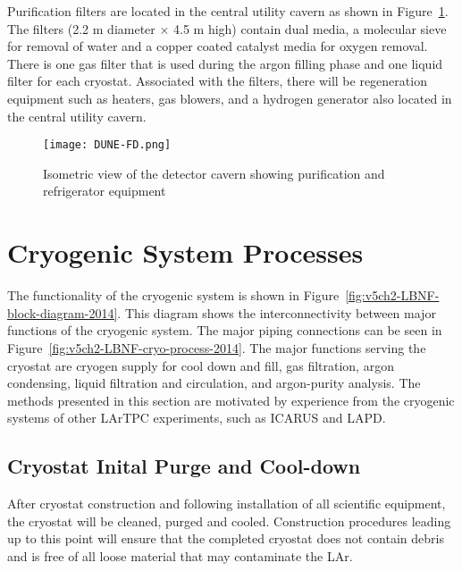 

Purification filters are located in the central utility cavern 
as shown in Figure~\ref{fig:det-cavern-purif}. The filters (2.2 m
diameter $\times$ 4.5 m high) contain dual media, a molecular sieve for removal of water and a copper
coated catalyst media for oxygen removal. There is one gas filter that is used during the argon
filling phase and one liquid filter for each cryostat. 
Associated with the
filters, there will be regeneration equipment such as heaters, gas blowers, and a hydrogen
generator also located in the central utility cavern.

\begin{figure}[htbp]
\centering
\texttt{[image: DUNE-FD.png]} 
\caption{Isometric view of the detector cavern showing purification and 
refrigerator equipment}
\label{fig:det-cavern-purif}
\end{figure}


\chapter{Cryogenic System Processes}
\label{sec:cryo-cryosys-proc}
The functionality of the cryogenic system is
shown in Figure~\ref{fig:v5ch2-LBNF-block-diagram-2014}. This diagram shows
the interconnectivity between major functions of the cryogenic system. The major piping
connections can be seen in Figure~\ref{fig:v5ch2-LBNF-cryo-process-2014}. The major functions serving the
cryostat are cryogen supply for cool down and fill, gas
filtration, argon condensing, liquid filtration and circulation, 
and argon-purity analysis. 
The methods presented in this section are motivated by
experience from the cryogenic systems of other LArTPC 
experiments, such as ICARUS and LAPD.

\section{Cryostat Inital Purge and Cool-down}

After cryostat construction and following installation of all scientific equipment, the cryostat
will be cleaned, purged and cooled. Construction procedures leading up to this point will
ensure that the completed cryostat does not contain debris and is free
of all loose material that may contaminate the LAr.

